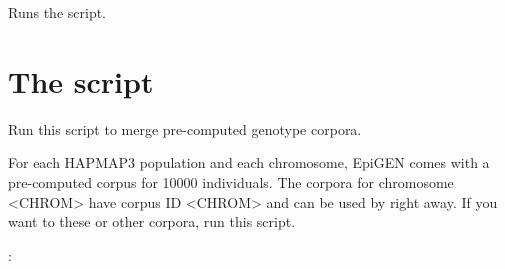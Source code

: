 \documentclass[a4paper,10pt,english]{sphinxhowto}
\begin{document}
\begin{fulllineitems}
\label{\detokenize{generate_genotype_corpus:generate_genotype_corpus.run_script}}
Runs the script.

\end{fulllineitems}



\section{The script }
\label{\detokenize{merge_genotype_corpora:module-merge_genotype_corpora}}\label{\detokenize{merge_genotype_corpora:the-script-merge-genotype-corpora-py}}\label{\detokenize{merge_genotype_corpora::doc}}
Run this script to merge pre-computed genotype corpora.

For each HAPMAP3 population and each chromosome, EpiGEN comes with a pre-computed corpus for 10000 individuals.
The corpora for chromosome \textless{}CHROM\textgreater{} have corpus ID \textless{}CHROM\textgreater{} and can be used by  right away.
If you want to these or other corpora, run this script.

:
\end{document}
